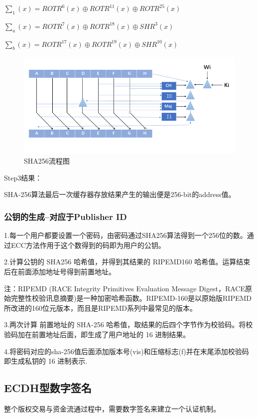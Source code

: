 \documentclass[withoutpreface,bwprint]{cumcmthesis} %
\begin{document}
$\sum_1(x) = ROTR^{6}(x) \oplus ROTR^{11}(x) \oplus ROTR^{25}(x)$

$\sum_a(x) = ROTR^{7}(x) \oplus ROTR^{18}(x) \oplus SHR^{3}(x)$

$\sum_b(x) = ROTR^{17}(x) \oplus ROTR^{19}(x) \oplus SHR^{10}(x)$

\begin{figure}[ht]
	\centering
	\includegraphics[width=.9\textwidth]{s256.png}
	\caption{SHA256流程图}
\end{figure}
Step3结果：

SHA-256算法最后一次缓存器存放结果产生的输出便是256-bit的address值。\newline

\subsubsection{公钥的生成--对应于Publisher ID}

1.每一个用户都要设置一个密码，由密码通过SHA256算法得到一个256位的数。通过ECC方法作用于这个数得到的码即为用户的公钥。

2.计算公钥的 SHA256 哈希值，并得到其结果的 RIPEMD160 哈希值。运算结束后在前面添加地址号得到前置地址。

注：RIPEMD (RACE Integrity Primitives Evaluation Message Digest，RACE原始完整性校验讯息摘要)是一种加密哈希函数。RIPEMD-160是以原始版RIPEMD所改进的160位元版本，而且是RIPEMD系列中最常见的版本。


3.两次计算 前置地址的 SHA-256 哈希值，取结果的后四个字节作为校验码。将校验码加在前置地址后面，即生成了用户地址的 16 进制结果。

4.将密码对应的sha-256值后面添加版本号(vis)和压缩标志(f)并在末尾添加校验码即生成私钥的 16 进制表示. 

\subsection{ECDH型数字签名}

整个版权交易与资金流通过程中，需要数字签名来建立一个认证机制。
\end{document}
